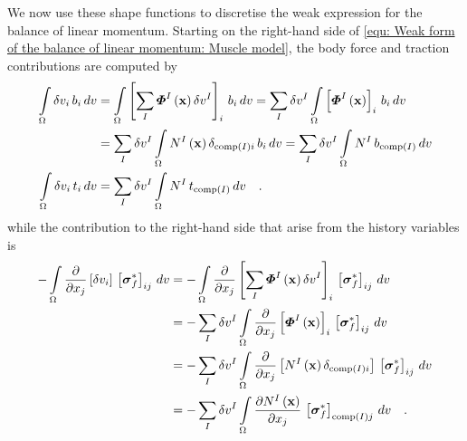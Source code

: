 \documentclass[]{scrartcl}
\begin{document}
We now use these shape functions to discretise the weak expression for the balance of linear momentum.
Starting on the right-hand side of \cref{equ: Weak form of the balance of linear momentum: Muscle model}, the body force and traction contributions are computed by
\begin{align}
\int\limits_{\Omega} \delta v_{i} \, b_{i} \, dv
  &= \int\limits_{\Omega} \left[ \sum\limits_{I} \boldsymbol{\varPhi}^{I} \left( \mathbf{x} \right) \delta v^{I} \right]_{i} \, b_{i} \, dv
   = \sum\limits_{I} \delta v^{I} \int\limits_{\Omega} \left[  \boldsymbol{\varPhi}^{I} \left( \mathbf{x} \right) \right]_{i} \, b_{i} \, dv \notag\\
  &= \sum\limits_{I} \delta v^{I} \int\limits_{\Omega} N^{I} \left( \mathbf{x} \right) \delta_{\textnormal{comp}(I) i} \, b_{i} \, dv
   = \sum\limits_{I} \delta v^{I} \int\limits_{\Omega} N^{I} \, b_{\textnormal{comp}(I)} \, dv 
\label{equ: Discretisation: Body force}
\\
\int\limits_{\Omega} \delta v_{i} \, t_{i} \, dv
  &= \sum\limits_{I} \delta v^{I} \int\limits_{\Omega} N^{I} \, t_{\textnormal{comp}(I)} \, dv 
\label{equ: Discretisation: Traction}
\quad .
\end{align}
while the contribution to the right-hand side that arise from the history variables is
\begin{align}
- \int\limits_{\Omega} \frac{\partial}{\partial x_{j}} \left[ \delta v_{i} \right] \, \left[ \boldsymbol{\sigma}_{f}^{\ast} \right]_{ij} \, dv
 &= - \int\limits_{\Omega} \frac{\partial}{\partial x_{j}} \left[ \sum\limits_{I} \boldsymbol{\varPhi}^{I} \left( \mathbf{x} \right) \delta v^{I} \right]_{i} \, \left[ \boldsymbol{\sigma}_{f}^{\ast} \right]_{ij} \, dv \notag\\
 &= - \sum\limits_{I} \delta v^{I} \int\limits_{\Omega} \frac{\partial}{\partial x_{j}} \left[  \boldsymbol{\varPhi}^{I} \left( \mathbf{x} \right)  \right]_{i} \, \left[ \boldsymbol{\sigma}_{f}^{\ast} \right]_{ij} \, dv \notag\\
 &= - \sum\limits_{I} \delta v^{I} \int\limits_{\Omega} \frac{\partial}{\partial x_{j}} \left[  N^{I} \left( \mathbf{x} \right) \delta_{\textnormal{comp}(I) i}  \right] \, \left[ \boldsymbol{\sigma}_{f}^{\ast} \right]_{ij} \, dv \notag\\
 &= - \sum\limits_{I} \delta v^{I} \int\limits_{\Omega} \frac{\partial N^{I} \left( \mathbf{x} \right)}{\partial x_{j}} \, \left[ \boldsymbol{\sigma}_{f}^{\ast} \right]_{\textnormal{comp}(I)j} \, dv 
\label{equ: Discretisation: Stress history}
\quad .
\end{align}
\end{document}
